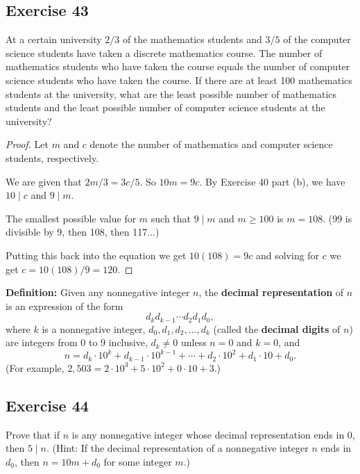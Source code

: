 \documentclass[14pt]{extarticle}
\newcommand{\cy}{\color{cyan}}
\begin{document}
\subsection{Exercise 43}
At a certain university $2/3$ of the mathematics students and $3/5$ of the computer science students have taken a discrete mathematics course. The number of mathematics students who have taken the course equals the number of computer science students who have taken the course. If there are at least 100 mathematics students at the university, what are the least possible number of mathematics students and the least possible number of computer science students at the university?

\begin{proof}
    Let $m$ and $c$ denote the number of mathematics and computer science students, respectively.

    We are given that $2m/3 = 3c/5$. So $10m = 9c$. By Exercise 40 part (b), we have $10 \mid c$ and $9 \mid m$.

    The smallest possible value for $m$ such that $9 \mid m$ and $m \geq 100$ is $m = 108$. (99 is divisible by 9, then 108, then 117...)

    Putting this back into the equation we get $10(108) = 9c$ and solving for $c$ we get $c = 10(108)/9 = 120$.
\end{proof}

\begin{tcolorbox}[colframe=cyan]
    {\bf \cy Definition:} Given any nonnegative integer $n$, the {\bf decimal representation} of $n$ is an expression of the form
    \[
        d_k d_{k-1} \cdots d_2d_1d_0,
    \]
    where $k$ is a nonnegative integer, $d_0, d_1, d_2, \ldots, d_k$ (called the {\bf decimal digits} of $n$) are integers from 0 to 9 inclusive, $d_k \neq 0$ unless $n = 0$ and $k = 0$, and
    \[
        n = d_k \cdot 10^k + d_{k-1} \cdot 10^{k-1} + \cdots + d_2 \cdot 10^2 + d_1 \cdot 10 + d_0.
    \]
    (For example, $2,503 = 2\cdot 10^3 + 5\cdot 10^2 + 0\cdot 10 + 3$.)
\end{tcolorbox}

\subsection{Exercise 44}
Prove that if $n$ is any nonnegative integer whose decimal representation ends in 0, then $5\mid n$. (Hint: If the decimal representation of a nonnegative integer $n$ ends in $d_0$, then $n = 10m + d_0$ for some integer $m$.)
\end{document}
